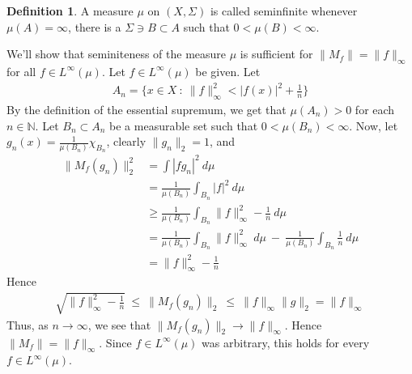 \documentclass[12pt]{exam}
\theoremstyle{plain} %
\theoremstyle{definition} %
\newtheorem{definition}{Definition}[section]
\theoremstyle{remark} %
\begin{document}
\begin{questions}
\begin{solution}
\begin{parts}
      \begin{definition}
        A measure $\mu$ on $(X, \Sigma)$ is called seminfinite
        whenever $\mu(A) = \infty$, there is a $\Sigma \ni B \subset
        A$ such that $0 < \mu(B) < \infty$.
      \end{definition}

      We'll show that seminiteness of the measure $\mu$ is sufficient
      for $\|M_f\| = \|f\|_\infty$ for all $f \in L^{\infty}(\mu)$.
      Let $f \in L^{\infty}(\mu)$ be given. Let
      \begin{align*}
        A_n = \Big \{ x \in X  \ : \  \|f\|_\infty^2 < |f(x)|^2 +
        \frac{1}{n} \Big \}
      \end{align*}
      By the definition of the essential supremum, we get that
      $\mu(A_n) > 0$ for each $n \in \mathbb{N}$. Let $B_n \subset
      A_n$ be a measurable set such that $0 < \mu(B_n) < \infty$.
      Now, let $g_n(x) = \frac{1}{\mu(B_n)} \chi_{B_n}$, clearly
      $\|g_n\|_2 = 1$, and
      \begin{align*}
        \|M_f(g_n)\|_2^2  &= \int |fg_n|^2 \ d \mu \\
        &= \frac{1}{\mu(B_n)}\int_{B_n} |f|^2 \ d \mu \\
        &\ge \frac{1}{\mu(B_n)}\int_{B_n} \|f\|_\infty^2 -
        \frac{1}{n} \ d \mu \\
        &= \frac{1}{\mu(B_n)}\int_{B_n} \|f\|_\infty^2 \ d \mu  \ - \
        \frac{1}{\mu(B_n)}\int_{B_n} \frac{1}{n} \ d \mu \\
        &= \|f\|_\infty^2 - \frac{1}{n}
      \end{align*}
      Hence
      \begin{align*}
        \sqrt{\|f\|_\infty^2 - \frac{1}{n}} \ \le \ \|M_f(g_n)\|_2 \ \le \
        \|f\|_\infty \|g\|_2 = \|f\|_\infty
      \end{align*}
      Thus, as $n \to \infty$, we see that $\|M_f(g_n)\|_2 \to
      \|f\|_\infty$. Hence $\|M_f\| = \|f\|_\infty$. Since $ f \in
      L^{\infty}( \mu)$ was arbitrary, this holds for every $ f \in
      L^{\infty}(\mu)$.

\end{parts}
\end{solution}
\end{questions}
\end{document}

